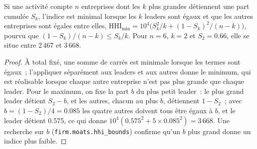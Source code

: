 \begin{proposition}\label{prop:fm:competition-and-the-future:bounds}
Si une activité compte $n$ entreprises dont les $k$ plus grandes détiennent une part cumulée $S_k$, l'indice est minimal lorsque les $k$ leaders sont égaux et que les autres entreprises
sont égales entre elles, $\mathrm{HHI}_{\min}=10^4\bigl(S_k^2/k+(1-S_k)^2/(n-k)\bigr)$, pourvu que $(1-S_k)/(n-k)\le S_k/k$. Pour $n=6$, $k=2$ et $S_2=0.66$, elle
se situe entre 2\,467 et 3\,668.
\end{proposition}

\begin{proof}
À total fixé, une somme de carrés est minimale lorsque les termes sont égaux~; l'appliquer séparément aux leaders et aux autres donne le
minimum, qui est réalisable lorsque chaque autre entreprise n'est pas plus grande que chaque leader. Pour le maximum, on fixe la part $b$ du plus petit leader~: le plus grand
leader détient $S_2-b$, et les autres, chacun au plus $b$, détiennent $1-S_2$~; avec $b=(1-S_2)/4=0.085$ les quatre autres doivent tous être égaux à $b$, et le leader
détient 0.575, ce qui donne $10^4(0.575^2+5\times0.085^2)=3\,668$. Une recherche sur $b$ (\texttt{firm.moats.hhi\_bounds}) confirme qu'un $b$ plus grand donne un indice plus faible.
\end{proof}

\begin{omfigure}
\par
{}\label{fig:fm:competition-and-the-future:bounds}
\end{omfigure}

